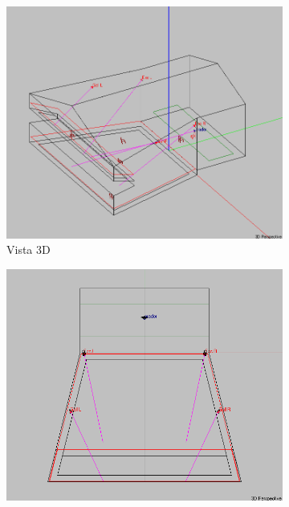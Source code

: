 \documentclass{article}
\begin{document}
\begin{figure}[H]
    \centering
    \begin{subfigure}[b]{0.45\linewidth}
        \includegraphics[width=\linewidth]{Para la memoria/Vista 3D.png}
        \caption{Vista 3D}
        \label{fig:3D}
    \end{subfigure}
    \begin{subfigure}[b]{0.45\linewidth}
        \includegraphics[width=\linewidth]{Para la memoria/Plano en planta.png}

\end{subfigure}
\end{figure}
\end{document}
